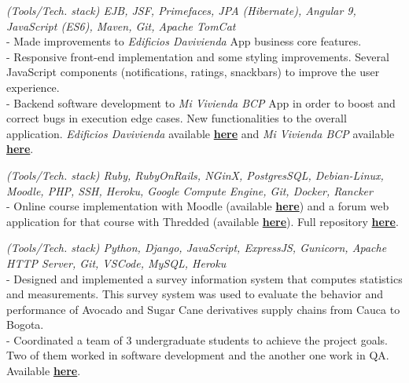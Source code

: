 \documentclass[]{CV-JuanCamiloFlorez}
\begin{document}
\begin{minipage}[t]{0.66\textwidth}
    \textit{(Tools/Tech. stack) EJB, JSF, Primefaces, JPA (Hibernate), Angular 9, JavaScript (ES6), Maven, Git, Apache TomCat} \\
        - Made improvements to \textit{Edificios Davivienda} App business core features. \\
        - Responsive front-end implementation and some styling improvements. Several JavaScript components (notifications, ratings, snackbars) to improve the user experience. \\
        - Backend software development to \textit{Mi Vivienda BCP} App in order to boost and correct bugs in execution edge cases. New functionalities to the overall application. \textit{Edificios Davivienda} available \textbf{\href{https://www.edificiosdavivienda.com}{here}} and \textit{Mi Vivienda BCP} available \textbf{\href{https://www.miviviendabcp.com.bo}{here}}. \\
        \sectionsep

    \focusareas{}
    \textit{(Tools/Tech. stack) Ruby, RubyOnRails, NGinX, PostgresSQL, Debian-Linux, Moodle, PHP, SSH, Heroku, Google Compute Engine, Git, Docker, Rancker} \\
        - Online course implementation with Moodle (available \textbf{\href{https://gitlab.com/VanJFlorez/animal_modeling_ethics/tree/master/docs/4 LMS build}{here}}) and a forum web application for that course with Thredded (available \textbf{\href{https://gitlab.com/VanJFlorez/animal_modeling_ethics/blob/master/docs/3\%20Social\%20WebApp/CP\%20etica\%20animal\%20webApp.pdf}{here}}). Full repository \textbf{\href{https://gitlab.com/VanJFlorez/animal_modeling_ethics/}{here}}. \\
        \sectionsep

    \focusareas{}
    \textit{(Tools/Tech. stack) Python, Django, JavaScript, ExpressJS, Gunicorn, Apache HTTP Server, Git, VSCode, MySQL, Heroku} \\
        - Designed and implemented a survey information system that computes statistics and measurements. This survey system was used to evaluate the behavior and performance of Avocado and Sugar Cane derivatives supply chains from Cauca to Bogota. \\
        - Coordinated a team of 3 undergraduate students to achieve the project goals. Two of them worked in software development and the another one work in QA. Available \textbf{\href{https://gitlab.com/VanJFlorez/sepro-webapp}{here}}. \\
        \sectionsep


\end{minipage}
\end{document}
